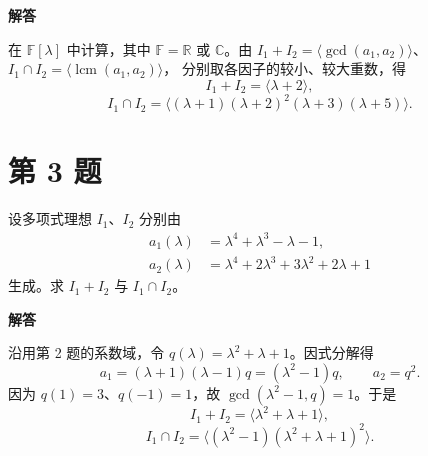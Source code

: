 \documentclass[UTF8,10pt,letterpaper,fontset=fandol]{ctexart}
\newcommand{\F}{\mathbb F}
\newcommand{\R}{\mathbb R}
\newcommand{\C}{\mathbb C}
\newcommand{\Ideal}[1]{\langle #1\rangle}
\newcommand{\Solution}{\par\Needspace{4\baselineskip}\textbf{解答}\par}
\begin{document}
\Solution
在 \(\F[\lambda]\) 中计算，其中 \(\F=\R\) 或 \(\C\)。由
\(I_1+I_2=\Ideal{\gcd(a_1,a_2)}\)、
\(I_1\cap I_2=\Ideal{\operatorname{lcm}(a_1,a_2)}\)，
分别取各因子的较小、较大重数，得
\[
\boxed{I_1+I_2=\Ideal{\lambda+2}},
\]
\[
\boxed{I_1\cap I_2=\Ideal{(\lambda+1)(\lambda+2)^2(\lambda+3)(\lambda+5)}}.
\]

\section{第 3 题}
设多项式理想 \(I_1\)、\(I_2\) 分别由
\[
\begin{aligned}
a_1(\lambda)&=\lambda^4+\lambda^3-\lambda-1,\\
a_2(\lambda)&=\lambda^4+2\lambda^3+3\lambda^2+2\lambda+1
\end{aligned}
\]
生成。求 \(I_1+I_2\) 与 \(I_1\cap I_2\)。

\Solution
沿用第 2 题的系数域，令 \(q(\lambda)=\lambda^2+\lambda+1\)。因式分解得
\[
a_1=(\lambda+1)(\lambda-1)q=(\lambda^2-1)q,\qquad a_2=q^2.
\]
因为 \(q(1)=3\)、\(q(-1)=1\)，故 \(\gcd(\lambda^2-1,q)=1\)。于是
\[
\boxed{I_1+I_2=\Ideal{\lambda^2+\lambda+1}},
\]
\[
\boxed{I_1\cap I_2=\Ideal{(\lambda^2-1)(\lambda^2+\lambda+1)^2}}.
\]
\end{document}
